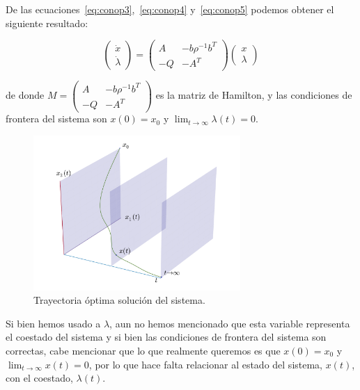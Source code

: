     De las ecuaciones~\ref{eq:conop3},~\ref{eq:conop4} y~\ref{eq:conop5} podemos obtener el siguiente resultado:

    \begin{equation} \label{eq:conop6}
        \begin{pmatrix}
            \dot{x} \\
            \dot{\lambda}
        \end{pmatrix} =
        \begin{pmatrix}
            A & -b \rho^{-1} b^T \\
            - Q & - A^T
        \end{pmatrix}
        \begin{pmatrix}
            x \\
            \lambda
        \end{pmatrix}
    \end{equation}

    de donde $M = \begin{pmatrix} A & -b \rho^{-1} b^T \\ - Q & - A^T \end{pmatrix}$ es la matriz de Hamilton, y las condiciones de frontera del sistema son $x(0) = x_0$ y $\lim_{t \to \infty} \lambda(t) = 0$.

    \begin{figure}
        \centering
        \includegraphics[width=0.7\textwidth]{./imagenes/trayectoria3d.pdf}
        \caption{\label{fig:trayectoriaoptima}Trayectoria óptima solución del sistema.}
    \end{figure}

    Si bien hemos usado a $\lambda$, aun no hemos mencionado que esta variable representa el coestado del sistema y si bien las condiciones de frontera del sistema son correctas, cabe mencionar que lo que realmente queremos es que $x(0) = x_0$ y $\lim_{t \to \infty} x(t) = 0$, por lo que hace falta relacionar al estado del sistema, $x(t)$, con el coestado, $\lambda(t)$.

